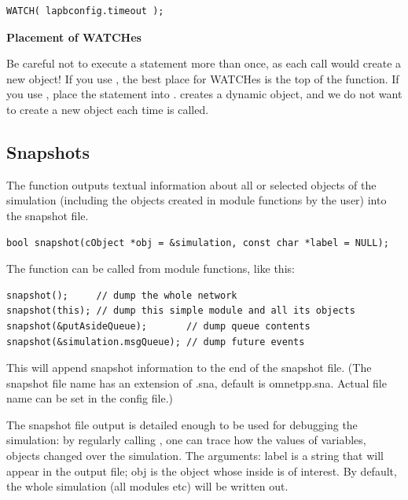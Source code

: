 \begin{Verbatim}
WATCH( lapbconfig.timeout );
\end{Verbatim}


\textbf{Placement of WATCHes}


Be careful not to execute a  statement more than once,
as each call would create a new  object! If you use
, the best place for WATCHes is the top of the
 function.  If you use ,
place the  statement into .
 creates a dynamic  object, and we do
not want to create a new object each time  is
called.



\subsection{Snapshots}

The  function outputs textual information about all
or selected objects of the simulation (including the objects created
in module functions by the user) into the snapshot file.

\begin{Verbatim}
bool snapshot(cObject *obj = &simulation, const char *label = NULL);
\end{Verbatim}


The function can be called from module functions, like this:

\begin{Verbatim}
snapshot();     // dump the whole network
snapshot(this); // dump this simple module and all its objects
snapshot(&putAsideQueue);       // dump queue contents
snapshot(&simulation.msgQueue); // dump future events
\end{Verbatim}

This will append snapshot information to the end of the snapshot file.
(The snapshot file name has an extension of .sna, default is
omnetpp.sna. Actual file name can be set in the
config file.)


The snapshot file output is detailed enough to be used for debugging 
the simulation: by regularly calling , one can trace 
how the values of variables, objects changed over the simulation. 
The arguments: label is a string that will appear in the output 
file; obj is the object whose inside is of interest. By default, 
the whole simulation (all modules etc) will be written out.


